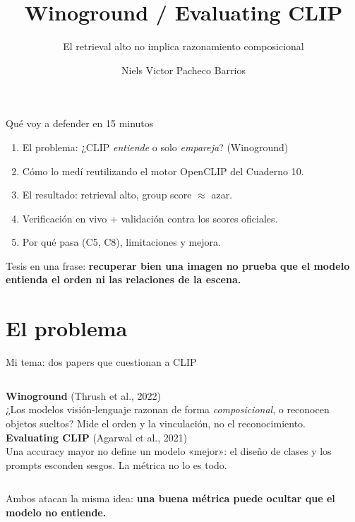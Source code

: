 \documentclass[aspectratio=169]{beamer}
\title{Winoground / Evaluating CLIP}
\subtitle{El retrieval alto no implica razonamiento composicional}
\author{Niels Victor Pacheco Barrios}
\institute{MCC225 — IA Generativa y Aprendizaje Multimodal · Examen Parcial 2026-1\\Cuadernos C5 · C8 · C10}
\date{}
\begin{document}
\maketitle

\begin{frame}{Qué voy a defender en 15 minutos}
  \begin{enumerate}
    \item El problema: ¿CLIP \emph{entiende} o solo \emph{empareja}? (Winoground)
    \item Cómo lo medí reutilizando el motor OpenCLIP del Cuaderno 10.
    \item El resultado: retrieval alto, \alert{group score $\approx$ azar}.
    \item Verificación en vivo + validación contra los scores oficiales.
    \item Por qué pasa (C5, C8), limitaciones y mejora.
  \end{enumerate}
  \vfill
  \footnotesize Tesis en una frase: \textbf{recuperar bien una imagen no prueba que el modelo
  entienda el orden ni las relaciones de la escena.}
\end{frame}

\section{El problema}

\begin{frame}{Mi tema: dos papers que cuestionan a CLIP}
  \begin{columns}[T]
    \textbf{Winoground} (Thrush et al., 2022)\\
    \footnotesize ¿Los modelos visión-lenguaje razonan de forma \emph{composicional},
    o reconocen objetos sueltos? Mide el orden y la vinculación, no el reconocimiento.
    \textbf{Evaluating CLIP} (Agarwal et al., 2021)\\
    \footnotesize Una accuracy mayor no define un modelo «mejor»: el diseño de clases y
    los prompts esconden sesgos. La métrica no lo es todo.
  \end{columns}
  \vfill
  \centering\footnotesize Ambos atacan la misma idea: \textbf{una buena métrica puede ocultar que el modelo no entiende.}
\end{frame}
\end{document}
